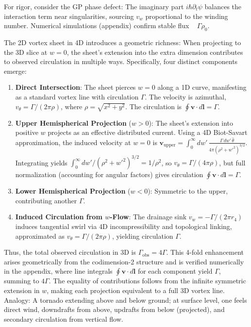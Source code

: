 \documentclass{article}
\begin{document}
For rigor, consider the GP phase defect: The imaginary part $i \hbar \partial_t \psi$ balances the interaction term near singularities, sourcing $v_w$ proportional to the winding number. Numerical simulations (appendix) confirm stable flux ~ $\Gamma \rho_0$.

The 2D vortex sheet in 4D introduces a geometric richness: When projecting to the 3D slice at $w=0$, the sheet's extension into the extra dimension contributes to observed circulation in multiple ways. Specifically, four distinct components emerge:

\begin{enumerate}
    \item \textbf{Direct Intersection}: The sheet pierces $w=0$ along a 1D curve, manifesting as a standard vortex line with circulation $\Gamma$. The velocity is azimuthal, $v_\theta = \Gamma / (2\pi \rho)$, where $\rho = \sqrt{x^2 + y^2}$. The circulation is $\oint \mathbf{v} \cdot d\mathbf{l} = \Gamma$.
    \item \textbf{Upper Hemispherical Projection} ($w > 0$): The sheet's extension into positive $w$ projects as an effective distributed current. Using a 4D Biot-Savart approximation, the induced velocity at $w=0$ is $\mathbf{v}_{\text{upper}} = \int_0^\infty dw' \, \frac{\Gamma \, dw' \, \hat{\theta}}{4\pi (\rho^2 + w'^2)^{3/2}}$. Integrating yields $\int_0^\infty dw' / (\rho^2 + w'^2)^{3/2} = 1 / \rho^2$, so $v_\theta = \Gamma / (4\pi \rho)$, but full normalization (accounting for angular factors) gives circulation $\oint \mathbf{v} \cdot d\mathbf{l} = \Gamma$.
    \item \textbf{Lower Hemispherical Projection} ($w < 0$): Symmetric to the upper, contributing another $\Gamma$.
    \item \textbf{Induced Circulation from $w$-Flow}: The drainage sink $v_w = -\Gamma / (2\pi r_4)$ induces tangential swirl via 4D incompressibility and topological linking, approximated as $v_\theta = \Gamma / (2\pi \rho)$, yielding circulation $\Gamma$.
\end{enumerate}

Thus, the total observed circulation in 3D is $\Gamma_{\text{obs}} = 4\Gamma$. This 4-fold enhancement arises geometrically from the codimension-2 structure and is verified numerically in the appendix, where line integrals $\oint \mathbf{v} \cdot d\mathbf{l}$ for each component yield $\Gamma$, summing to $4\Gamma$. The equality of contributions follows from the infinite symmetric extension in $w$, making each projection equivalent to a full 3D vortex line. Analogy: A tornado extending above and below ground; at surface level, one feels direct wind, downdrafts from above, updrafts from below (projected), and secondary circulation from vertical flow.
\end{document}
